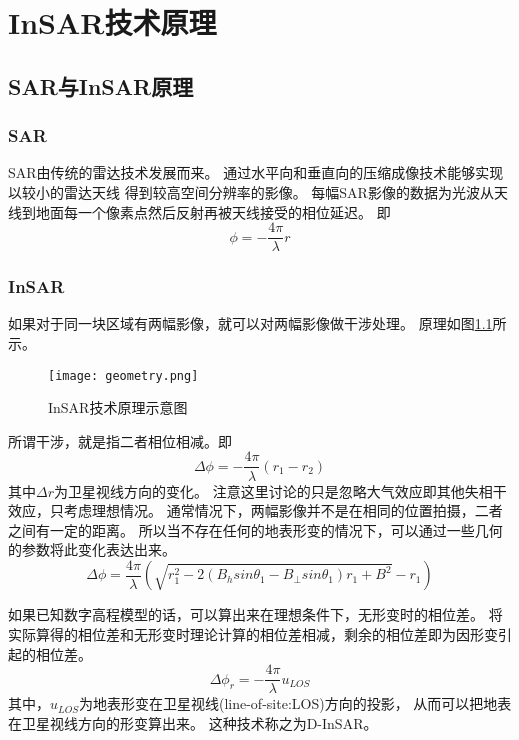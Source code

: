 \chapter{InSAR技术原理}

\section{SAR与InSAR原理}

\subsection{SAR}

SAR由传统的雷达技术发展而来。
通过水平向和垂直向的压缩成像技术能够实现以较小的雷达天线
得到较高空间分辨率的影像。
每幅SAR影像的数据为光波从天线到地面每一个像素点然后反射再被天线接受的相位延迟。
即
\begin{equation}
    \phi=-\frac{4\pi}{\lambda}r
\end{equation}

\subsection{InSAR}

如果对于同一块区域有两幅影像，就可以对两幅影像做干涉处理。
原理如图\ref{fig:geometry}所示。
\begin{figure}[htb!]
    \centering
    \texttt{[image: geometry.png]}
    \caption{InSAR技术原理示意图}
    \label{fig:geometry}
\end{figure}
所谓干涉，就是指二者相位相减。即
\begin{equation}
    \Delta \phi=-\frac{4\pi}{\lambda}(r_1-r_2)
\end{equation}
其中$\Delta r$为卫星视线方向的变化。
注意这里讨论的只是忽略大气效应即其他失相干效应，只考虑理想情况。
通常情况下，两幅影像并不是在相同的位置拍摄，二者之间有一定的距离。
所以当不存在任何的地表形变的情况下，可以通过一些几何的参数将此变化表达出来。
\begin{equation}
    \Delta \phi=\frac{4\pi}{\lambda}\left(\sqrt{r_1^2−2(B_hsinθ_1−B_{\perp}sinθ_1)r_1+B^2}−r_1\right)
\end{equation}

如果已知数字高程模型的话，可以算出来在理想条件下，无形变时的相位差。
将实际算得的相位差和无形变时理论计算的相位差相减，剩余的相位差即为因形变引起的相位差。
\begin{equation}
    \Delta \phi_{r}=-\frac{4\pi}{\lambda}u_{LOS}
\end{equation}
其中，$u_{LOS}$为地表形变在卫星视线(line-of-site:LOS)方向的投影，
从而可以把地表在卫星视线方向的形变算出来。
这种技术称之为D-InSAR。


